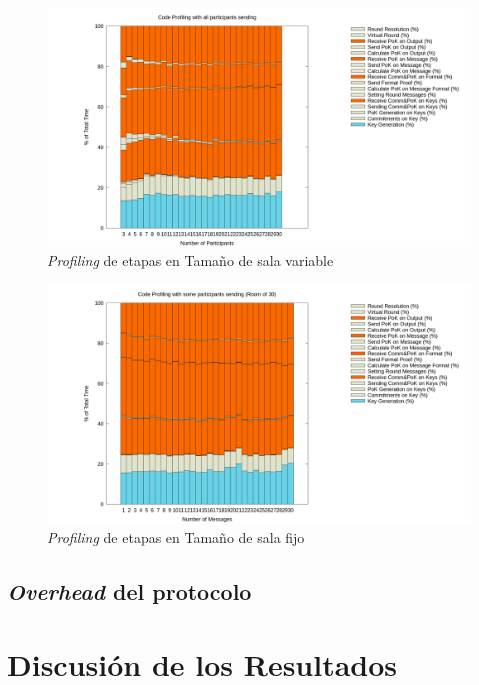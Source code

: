\begin{figure}[H]
  \centering
    \includegraphics[scale=0.25]{logs/logs_all/profile.png}
  \caption{\emph{Profiling} de etapas en Tamaño de sala variable}
  \label{fig:profile-variable}
\end{figure}

\begin{figure}[H]
  \centering
    \includegraphics[scale=0.25]{logs/logs_partial_30/profile.png}
  \caption{\emph{Profiling} de etapas en Tamaño de sala fijo}
  \label{fig:profile-fixed}
\end{figure}

\subsection{\emph{Overhead} del protocolo}


\section{Discusión de los Resultados}

